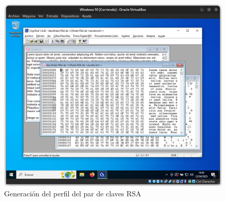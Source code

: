 \begin{figure}[H]
    \includegraphics[width=15cm]{DesencriptadoRSA-2}
    \caption{Generación del perfil del par de claves RSA}
\end{figure}
